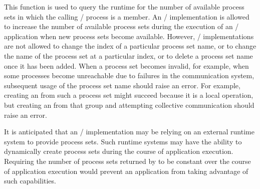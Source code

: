 This function is used to query the runtime for the number of available process sets in which the calling \MPI/ process is a member.
An \MPI/ implementation is allowed to increase the number of available process sets
during the execution of an \MPI/ application when new process sets become available.
However, \MPI/ implementations are not allowed
to change the index of a particular process set name,
or to change the name of the process set at a particular index,
or to delete a process set name once it has been added.
When a process set becomes invalid,
for example, when some processes become unreachable due to failures in the communication system,
subsequent usage of the process set name should raise an error.
For example, creating an  from such a process set might succeed because it is a local operation,
but creating an  from that group and attempting collective communication
should raise an error.

\begin{implementors}
It is anticipated that an \MPI/ implementation may be relying on an external runtime system to provide process sets.
Such runtime systems may have the ability to dynamically create process sets during the course of application execution.
Requiring the number of process sets returned by 
to be constant over the course of application execution would prevent an application from taking advantage of such capabilities.
\end{implementors}

